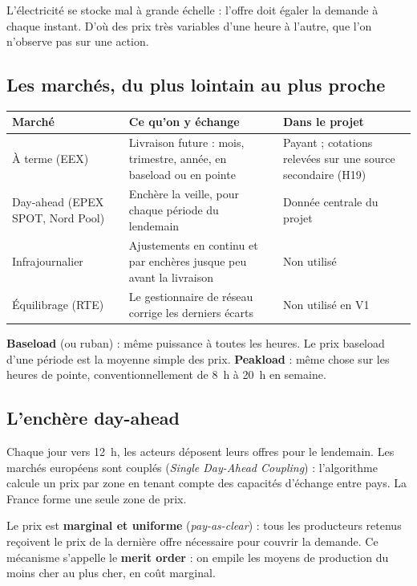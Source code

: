 \documentclass[11pt,a4paper]{article}
\begin{document}
L'électricité se stocke mal à grande échelle : l'offre doit égaler la demande à chaque instant. D'où des
prix très variables d'une heure à l'autre, que l'on n'observe pas sur une action.

\subsection{Les marchés, du plus lointain au plus proche}

\begin{center}
\begin{tabularx}{\linewidth}{>{\raggedright\arraybackslash}p{3.6cm}YY}
\toprule
\textbf{Marché} & \textbf{Ce qu'on y échange} & \textbf{Dans le projet} \\
\midrule
À terme (EEX) & Livraison future : mois, trimestre, année, en baseload ou en pointe & Payant ; cotations relevées sur une source secondaire (H19) \\
Day-ahead (EPEX SPOT, Nord Pool) & Enchère la veille, pour chaque période du lendemain & Donnée centrale du projet \\
Infrajournalier & Ajustements en continu et par enchères jusque peu avant la livraison & Non utilisé \\
Équilibrage (RTE) & Le gestionnaire de réseau corrige les derniers écarts & Non utilisé en V1 \\
\bottomrule
\end{tabularx}
\end{center}

\textbf{Baseload} (ou ruban) : même puissance à toutes les heures. Le prix baseload d'une période est la
moyenne simple des prix. \textbf{Peakload} : même chose sur les heures de pointe, conventionnellement de
8~h à 20~h en semaine.

\subsection{L'enchère day-ahead}

Chaque jour vers 12~h, les acteurs déposent leurs offres pour le lendemain. Les marchés européens sont
couplés (\emph{Single Day-Ahead Coupling}) : l'algorithme calcule un prix par zone en tenant compte des
capacités d'échange entre pays. La France forme une seule zone de prix.

Le prix est \textbf{marginal et uniforme} (\emph{pay-as-clear}) : tous les producteurs retenus reçoivent le
prix de la dernière offre nécessaire pour couvrir la demande. Ce mécanisme s'appelle le \textbf{merit
order} : on empile les moyens de production du moins cher au plus cher, en coût marginal.
\end{document}
